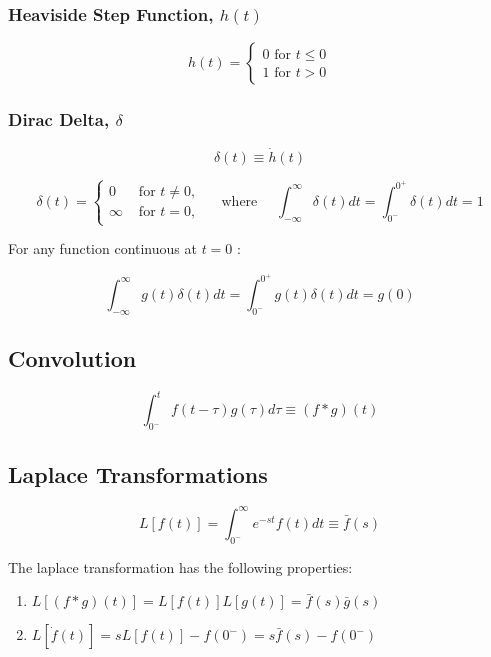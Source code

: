 \hypertarget{heaviside-step-function-ht}{%
\subsubsection{\texorpdfstring{Heaviside Step Function,
\(h(t)\)}{Heaviside Step Function, h(t)}}\label{heaviside-step-function-ht}}

\[h(t)=\left\{\begin{array}{l}{0 \text { for } t \leq 0} \\ {1 \text { for } t>0}\end{array}\right.\]

\hypertarget{dirac-delta-delta}{%
\subsubsection{\texorpdfstring{Dirac Delta,
\(\delta\)}{Dirac Delta, \textbackslash delta}}\label{dirac-delta-delta}}

\[\delta(t) \equiv \dot{h}(t)\]

\[\delta(t)=\left\{\begin{array}{ll}{0} & {\text { for } t \neq 0,} \\ {\infty} & {\text { for } t=0,}\end{array} \quad \text { where } \quad \int_{-\infty}^{\infty} \delta(t) d t=\int_{0^{-}}^{0^{+}} \delta(t) d t=1\right.\]

For any function continuous at \(t=0\) :

\[\int_{-\infty}^{\infty} g(t) \delta(t) d t=\int_{0^{-}}^{0^{+}} g(t) \delta(t) d t=g(0)\]

\hypertarget{convolution}{%
\subsection{Convolution}\label{convolution}}

\[
\int_{0^{-}}^{t} f(t-\tau) g(\tau) d \tau \equiv(f * g)(t)
\]

\hypertarget{laplace-transformations}{%
\subsection{Laplace Transformations}\label{laplace-transformations}}

\[
L[f(t)]=\int_{0^{-}}^{\infty} e^{-s t} f(t) d t \equiv \bar{f}(s)
\]

The laplace transformation has the following properties:

\begin{enumerate}
\def\labelenumi{\arabic{enumi}.}
\item
  \(L[(f * g)(t)]=L[f(t)] L[g(t)]=\bar{f}(s) \bar{g}(s)\)
\item
  \(L[\dot{f}(t)]=s L[f(t)]-f\left(0^{-}\right)=s \bar{f}(s)-f\left(0^{-}\right)\)
\end{enumerate}
